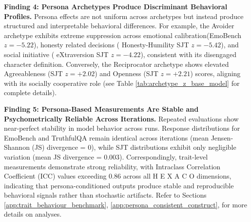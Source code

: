 \documentclass[11pt]{article}
\newcommand{\hexaco}{%
  {\textcolor{hexH}{H}}%
  {\textcolor{hexE}{E}}%
  {\textcolor{hexX}{X}}%
  {\textcolor{hexA}{A}}%
  {\textcolor{hexC}{C}}%
  {\textcolor{hexO}{O}}%
}
\newcommand{\honestyhumility}{%
  {\textcolor{hexH}{Honesty-Humility}}%
}
\newcommand{\extraversion}{%
  {\textcolor{hexX}{eXtraversion}}%
}
\newcommand{\agreeableness}{%
  {\textcolor{hexA}{Agreeableness}}%
}
\newcommand{\openness}{%
  {\textcolor{hexO}{Openness}}%
}
\begin{document}
\noindent\textbf{Finding 4: Persona Archetypes Produce Discriminant Behavioral Profiles.}
Persona effects are not uniform across archetypes but instead produce structured and interpretable behavioral differences. For example, the Avoider archetype exhibits extreme suppression across emotional calibration(EmoBench $z = -5.22$), honesty related decisions (\honestyhumility\; SJT $z = -5.42$), and social initiative (\extraversion\; SJT $z = -4.22$), consistent with its disengaged character definition. Conversely, the Reciprocator archetype shows elevated \agreeableness\; (SJT $z = +2.02$) and \openness\; (SJT $z = +2.21$) scores, aligning with its socially cooperative role (see Table \ref{tab:archetype_z_base_model} for complete details). 


\noindent\textbf{Finding 5: Persona-Based Measurements Are Stable and Psychometrically Reliable Across Iterations.}
Repeated evaluations show near-perfect stability in model behavior across runs. Response distributions for EmoBench and TruthfulQA remain identical across iterations (mean Jensen-Shannon (JS) divergence = 0), while SJT distributions exhibit only negligible variation (mean JS divergence = 0.003). Correspondingly, trait-level measurements demonstrate strong reliability, with Intraclass Correlation Coefficient (ICC) values exceeding 0.86 across all \hexaco\; dimensions, indicating that persona-conditioned outputs produce stable and reproducible behavioral signals rather than stochastic artifacts. Refer to Sections 
\ref{app:trait_behaviour_benchmark},
\ref{app:persona_consistent_construct}, for more details on analyses.
\end{document}
